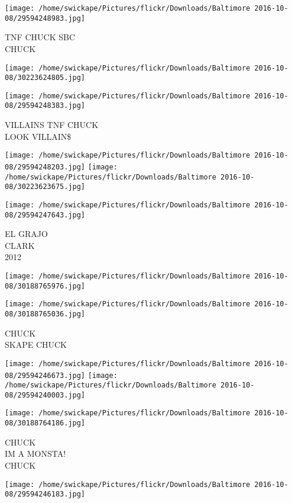 \documentclass[10pt,letterpaper]{article}
\begin{document}
\vspace{0.25in}
\texttt{[image: /home/swickape/Pictures/flickr/Downloads/Baltimore 2016-10-08/29594248983.jpg]}

TNF CHUCK SBC\\
CHUCK
\pagebreak

\texttt{[image: /home/swickape/Pictures/flickr/Downloads/Baltimore 2016-10-08/30223624805.jpg]}

\vspace{0.25in}
\texttt{[image: /home/swickape/Pictures/flickr/Downloads/Baltimore 2016-10-08/29594248383.jpg]}

VILLAINS TNF CHUCK\\
LOOK VILLAIN\$
\pagebreak

\texttt{[image: /home/swickape/Pictures/flickr/Downloads/Baltimore 2016-10-08/29594248203.jpg]}
\texttt{[image: /home/swickape/Pictures/flickr/Downloads/Baltimore 2016-10-08/30223623675.jpg]}

\vspace{0.25in}
\texttt{[image: /home/swickape/Pictures/flickr/Downloads/Baltimore 2016-10-08/29594247643.jpg]}

EL GRAJO\\
CLARK\\
2012
\pagebreak

\texttt{[image: /home/swickape/Pictures/flickr/Downloads/Baltimore 2016-10-08/30188765976.jpg]}

\vspace{0.25in}
\texttt{[image: /home/swickape/Pictures/flickr/Downloads/Baltimore 2016-10-08/30188765036.jpg]}

CHUCK\\
SKAPE CHUCK
\pagebreak

\texttt{[image: /home/swickape/Pictures/flickr/Downloads/Baltimore 2016-10-08/29594246673.jpg]}
\texttt{[image: /home/swickape/Pictures/flickr/Downloads/Baltimore 2016-10-08/29594240003.jpg]}

\vspace{0.25in}
\texttt{[image: /home/swickape/Pictures/flickr/Downloads/Baltimore 2016-10-08/30188764186.jpg]}

CHUCK\\
IM A MONSTA!\\
CHUCK
\pagebreak

\texttt{[image: /home/swickape/Pictures/flickr/Downloads/Baltimore 2016-10-08/29594246183.jpg]}
\end{document}

